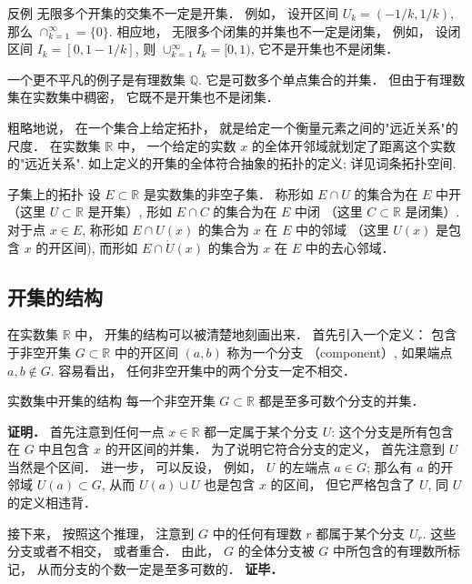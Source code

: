 \begin{example}{反例}
无限多个开集的交集不一定是开集． 例如， 设开区间 $U_k=(-1/k,1/k)$, 那么 $\cap_{k=1}^\infty=\{0\}$. 相应地， 无限多个闭集的并集也不一定是闭集， 例如， 设闭区间 $I_k=[0,1-1/k]$, 则 $\cup_{k=1}^\infty I_k=[0,1)$, 它不是开集也不是闭集．

一个更不平凡的例子是有理数集 $\mathbb{Q}$. 它是可数多个单点集合的并集． 但由于有理数集在实数集中稠密， 它既不是开集也不是闭集．
\end{example}

粗略地说， 在一个集合上给定拓扑， 就是给定一个衡量元素之间的"远近关系"的尺度． 在实数集 $\mathbb{R}$ 中， 一个给定的实数 $x$ 的全体开邻域就划定了距离这个实数的"远近关系". 如上定义的开集的全体符合抽象的拓扑的定义; 详见词条拓扑空间.

\begin{definition}{子集上的拓扑}
设 $E\subset\mathbb{R}$ 是实数集的非空子集． 称形如 $E\cap U$ 的集合为在 $E$ 中开 （这里 $U\subset\mathbb{R}$ 是开集）, 形如 $E\cap C$ 的集合为在 $E$ 中闭 （这里 $C\subset\mathbb{R}$ 是闭集）. 对于点 $x\in E$, 称形如 $E\cap U(x)$ 的集合为 $x$ 在 $E$ 中的邻域 （这里 $U(x)$ 是包含 $x$ 的开区间), 而形如 $E\cap \mathring U(x)$ 的集合为 $x$ 在 $E$ 中的去心邻域．
\end{definition}

\subsection{开集的结构}
在实数集 $\mathbb{R}$ 中， 开集的结构可以被清楚地刻画出来． 首先引入一个定义： 包含于非空开集 $G\subset\mathbb{R}$ 中的开区间 $(a,b)$ 称为一个分支 （component）, 如果端点 $a,b\notin G$. 容易看出， 任何非空开集中的两个分支一定不相交．

\begin{theorem}{实数集中开集的结构}
每一个非空开集 $G\subset\mathbb{R}$ 都是至多可数个分支的并集． 
\end{theorem}
\textbf{证明．} 首先注意到任何一点 $x\in\mathbb{R}$ 都一定属于某个分支 $U$: 这个分支是所有包含在 $G$ 中且包含 $x$ 的开区间的并集． 为了说明它符合分支的定义， 首先注意到 $U$ 当然是个区间． 进一步， 可以反设， 例如， $U$ 的左端点 $a\in G$; 那么有 $a$ 的开邻域 $U(a)\subset G$, 从而 $U(a)\cup U$ 也是包含 $x$ 的区间， 但它严格包含了 $U$, 同 $U$ 的定义相违背．

接下来， 按照这个推理， 注意到 $G$ 中的任何有理数 $r$ 都属于某个分支 $U_r$. 这些分支或者不相交， 或者重合． 由此， $G$ 的全体分支被 $G$ 中所包含的有理数所标记， 从而分支的个数一定是至多可数的． \textbf{证毕．}

